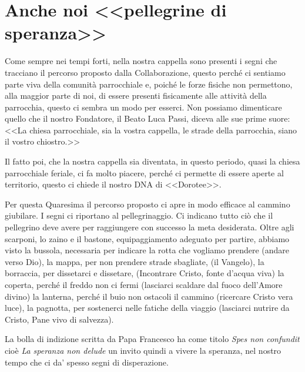 \section{Anche noi <<pellegrine di speranza>>}

Come sempre nei tempi forti, nella nostra cappella sono presenti i segni che tracciano il percorso proposto dalla Collaborazione, questo perché ci sentiamo parte viva della comunità parrocchiale e, poiché le forze fisiche non permettono, alla maggior parte di noi, di essere presenti fisicamente alle attività della parrocchia, questo ci sembra un modo per esserci. Non possiamo dimenticare quello che il nostro Fondatore, il Beato Luca Passi, diceva alle sue prime suore: <<La chiesa parrocchiale, sia la vostra cappella, le strade della parrocchia, siano il vostro chiostro.>>


Il fatto poi, che la nostra cappella sia diventata, in questo periodo, quasi la chiesa parrocchiale feriale, ci fa molto piacere, perché ci permette di essere aperte al territorio, questo ci chiede il nostro DNA di <<Dorotee>>.

Per questa Quaresima il percorso proposto ci apre in modo efficace al cammino giubilare. I segni ci riportano al pellegrinaggio. Ci indicano tutto ciò che il pellegrino deve avere per raggiungere con successo la meta desiderata. Oltre agli scarponi, lo zaino e il bastone, equipaggiamento adeguato per partire, abbiamo visto la bussola, necessaria per indicare la rotta che vogliamo prendere (andare verso Dio), la mappa, per non prendere strade sbagliate, (il Vangelo), la borraccia, per dissetarci e dissetare, (Incontrare Cristo, fonte d'acqua viva) la coperta, perché il freddo non ci fermi (lasciarci scaldare dal fuoco dell'Amore divino) la lanterna, perché il buio non ostacoli il cammino (ricercare Cristo vera luce), la pagnotta, per sostenerci nelle fatiche della viaggio (lasciarci nutrire da Cristo, Pane vivo di salvezza).

La bolla di indizione scritta da Papa Francesco ha come titolo \textit{Spes non confundit} cioè \textit{La speranza non delude} un invito quindi a vivere la speranza, nel nostro tempo che ci da' spesso segni di disperazione.

